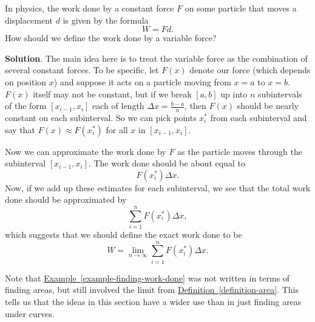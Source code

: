 \documentclass[10pt,]{book}
\theoremstyle{ptxplainnotitle}
\theoremstyle{ptxplaintitle}
\theoremstyle{ptxplainnotitle}
\theoremstyle{ptxplaintitle}
\theoremstyle{ptxplainnotitle}
\theoremstyle{ptxplaintitle}
\theoremstyle{ptxdefinitionnotitle}
\theoremstyle{ptxdefinitiontitle}
\theoremstyle{ptxdefinitionnotitle}
\theoremstyle{ptxdefinitiontitle}
\theoremstyle{ptxdefinitionnotitle}
\theoremstyle{ptxdefinitiontitle}
\theoremstyle{ptxdefinitionnotitle}
\theoremstyle{ptxdefinitiontitle}
\theoremstyle{ptxdefinitionnotitle}
\theoremstyle{ptxdefinitiontitle}
\numberwithin{equation}{section}
\begin{document}
\begin{example}\label{example-finding-work-done}
\hypertarget{p-421}{}%
In physics, the work done by a constant force \(F\) on some particle that moves a displacement \(d\) is given by the formula%
\begin{equation*}
W = Fd.
\end{equation*}
How should we define the work done by a variable force?%
\par\smallskip%
\noindent\textbf{Solution}.\hypertarget{solution-93}{}\quad%
\hypertarget{p-422}{}%
The main idea here is to treat the variable force as the combination of several constant forces. To be specific, let \(F(x)\) denote our force (which depends on position \(x\)) and suppose it acts on a particle moving from \(x=a\) to \(x=b\). \(F(x)\) itself may not be constant, but if we break \([a,b]\) up into \(n\) subintervals of the form \([x_{i-1},x_{i}]\) each of length \(\Delta x = \frac{b-a}{n}\), then \(F(x)\) should be nearly constant on each subinterval. So we can pick points \(x_{i}^{*}\) from each subinterval and say that \(F(x)\approx F(x_{i}^{*})\) for all \(x\) in \([x_{i-1},x_{i}]\).%
\par
\hypertarget{p-423}{}%
Now we can approximate the work done by \(F\) as the particle moves through the subinterval \([x_{i-1},x_{i}]\). The work done should be about equal to%
\begin{equation*}
F(x_{i}^{*})\Delta x\text{.}
\end{equation*}
Now, if we add up these estimates for each subinterval, we see that the total work done should be approximated by%
\begin{equation*}
\sum_{i=1}^{n}F(x_{i}^{*})\Delta x,
\end{equation*}
which suggests that we should define the exact work done to be%
\begin{equation*}
W = \lim_{n\to\infty}\sum_{i=1}^{n}F(x_{i}^{*})\Delta x.
\end{equation*}
%
\end{example}
\hypertarget{p-424}{}%
Note that \hyperref[example-finding-work-done]{Example~\ref{example-finding-work-done}} was not written in terms of finding areas, but still involved the limit from \hyperref[definition-area]{Definition~\ref{definition-area}}. This tells us that the ideas in this section have a wider use than in just finding areas under curves.%
\typeout{************************************************}
\typeout{************************************************}
\end{document}
